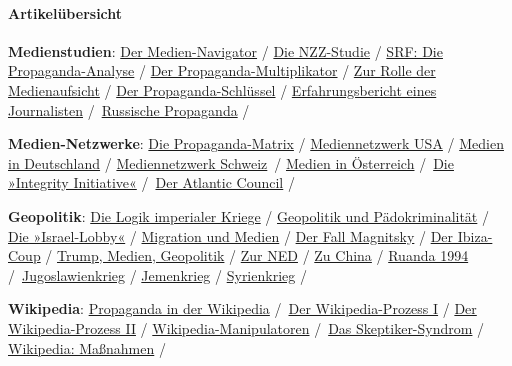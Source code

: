 \hypertarget{artikeluxfcbersicht}{%
\paragraph{Artikelübersicht}\label{artikeluxfcbersicht}}

\textbf{Medienstudien}: \href{https://swprs.org/medien-navigator/}{Der
Medien-Navigator} / \href{https://swprs.org/die-nzz-studie/}{Die
NZZ-Studie} / \href{https://swprs.org/srf-propaganda-analyse/}{SRF: Die
Propaganda-Analyse} /
\href{https://swprs.org/der-propaganda-multiplikator/}{Der
Propaganda-Multiplikator} /
\href{https://swprs.org/srf-ombudsstelle-im-faktencheck/}{Zur Rolle der
Medienaufsicht} /
\href{https://swprs.org/der-propaganda-schluessel/}{Der
Propaganda-Schlüssel} /
\href{https://swprs.org/bericht-eines-journalisten/}{Erfahrungsbericht
eines Journalisten}
/~\href{https://swprs.org/russische-propaganda/}{Russische Propaganda} /

\textbf{Medien-Netzwerke}:
\href{https://swprs.org/die-propaganda-matrix/}{Die Propaganda-Matrix} /
\href{https://swprs.org/das-american-empire-und-seine-medien/}{Mediennetzwerk
USA} / \href{https://swprs.org/netzwerk-medien-deutschland/}{Medien in
Deutschland} /
\href{https://swprs.org/netzwerk-medien-schweiz/}{Mediennetzwerk
Schweiz}~/ \href{https://swprs.org/medien-in-oesterreich/}{Medien in
Österreich} /~\href{https://swprs.org/die-integrity-initiative/}{Die
»Integrity Initiative«} /~\href{https://swprs.org/atlantic-council/}{Der
Atlantic Council} /

\textbf{Geopolitik}:
\href{https://swprs.org/logik-imperialer-kriege/}{Die Logik imperialer
Kriege} /
\href{https://swprs.org/geopolitik-und-paedokriminalitaet/}{Geopolitik
und Pädokriminalität} /
\href{https://swprs.org/die-israel-lobby-fakten-und-mythen/}{Die
»Israel-Lobby«} /
\href{https://swprs.org/migration-und-medien/}{Migration und Medien} /
\href{https://swprs.org/der-fall-magnitsky/}{Der Fall Magnitsky} /
\href{https://swprs.org/ibiza-zusammenfassung/}{Der Ibiza-Coup} /
\href{https://swprs.org/trump-medien-geopolitik/}{Trump, Medien,
Geopolitik} /
\href{https://swprs.org/organizations-funded-by-the-ned/}{Zur NED} /
\href{https://swprs.org/zu-china/}{Zu China} /
\href{https://swprs.org/ruanda-was-geschah-wirklich/}{Ruanda 1994}
/~\href{https://swprs.org/propaganda-im-jugoslawienkrieg/}{Jugoslawienkrieg}
/ \href{https://swprs.org/jemenkrieg-und-medien/}{Jemenkrieg} /
\href{https://swprs.org/syrienkrieg-geopolitik-medien/}{Syrienkrieg} /

\textbf{Wikipedia}:
\href{https://swprs.org/propaganda-in-der-wikipedia/}{Propaganda in der
Wikipedia} /~\href{https://swprs.org/der-wikipedia-prozess/}{Der
Wikipedia-Prozess I} /
\href{https://swprs.org/weiteres-urteil-im-fall-wikipedia/}{Der
Wikipedia-Prozess II} /
\href{https://swprs.org/wikipedia-manipulation-autoren/}{Wikipedia-Manipulatoren}
/~\href{https://swprs.org/das-skeptiker-syndrom/}{Das Skeptiker-Syndrom}
/ \href{https://swprs.org/wikipedia-missbrauch-massnahmen/}{Wikipedia:
Maßnahmen} /

